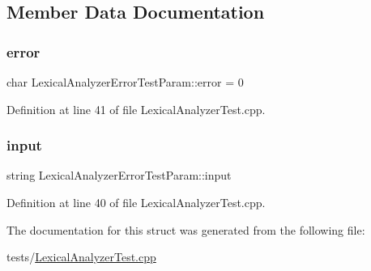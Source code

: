 \subsection{Member Data Documentation}
\mbox{\label{struct_lexical_analyzer_error_test_param_aab37ca9d0544a4299b23e2c77f9c309c}} 
\subsubsection{\texorpdfstring{error}{error}}
{\footnotesize\ttfamily char Lexical\+Analyzer\+Error\+Test\+Param\+::error = \textquotesingle{}0\textquotesingle{}}



Definition at line 41 of file Lexical\+Analyzer\+Test.\+cpp.

\mbox{\label{struct_lexical_analyzer_error_test_param_ab55190d65d3bcaab962dcbe15bd60953}} 
\subsubsection{\texorpdfstring{input}{input}}
{\footnotesize\ttfamily string Lexical\+Analyzer\+Error\+Test\+Param\+::input}



Definition at line 40 of file Lexical\+Analyzer\+Test.\+cpp.



The documentation for this struct was generated from the following file\+:\begin{DoxyCompactItemize}
\item 
tests/\hyperlink{_lexical_analyzer_test_8cpp}{Lexical\+Analyzer\+Test.\+cpp}\end{DoxyCompactItemize}
